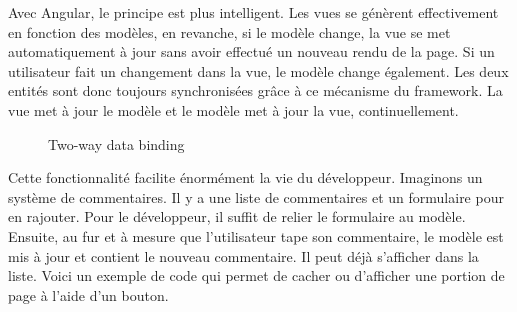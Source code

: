 \documentclass[a4paper,10pt,twoside]{sphinxmanual}
\begin{document}
Avec Angular, le principe est plus intelligent. Les vues se génèrent effectivement en fonction des modèles, en revanche, si le modèle change, la vue se met automatiquement à jour sans avoir effectué un nouveau rendu de la page. Si un utilisateur fait un changement dans la vue, le modèle change également. Les deux entités sont donc toujours synchronisées grâce à ce mécanisme du framework. La vue met à jour le modèle et le modèle met à jour la vue, continuellement.
\begin{figure}[htbp]
\centering
\capstart

\caption{Two-way data binding}\end{figure}

Cette fonctionnalité facilite énormément la vie du développeur. Imaginons un système de commentaires. Il y a une liste de commentaires et un formulaire pour en rajouter. Pour le développeur, il suffit de relier le formulaire au modèle. Ensuite, au fur et à mesure que l'utilisateur tape son commentaire, le modèle est mis à jour et contient le nouveau commentaire. Il peut déjà s'afficher dans la liste. Voici un exemple de code qui permet de cacher ou d'afficher une portion de page à l'aide d'un bouton.
\end{document}
